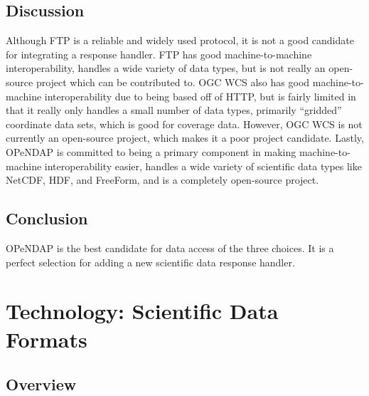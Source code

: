 \documentclass[onecolumn, draftclsnofoot,10pt, compsoc]{IEEEtran}
\begin{document}
\subsection{Discussion}
Although FTP is a reliable and widely used protocol, it is not a good candidate for integrating a response handler. FTP has good machine-to-machine interoperability, handles a wide variety of data types, but is not really an open-source project which can be contributed to. OGC WCS also has good machine-to-machine interoperability due to being based off of HTTP, but is fairly limited in that it really only handles a small number of data types, primarily “gridded” coordinate data sets, which is good for coverage data. However, OGC WCS is not currently an open-source project, which makes it a poor project candidate. Lastly, OPeNDAP is committed to being a primary component in making machine-to-machine interoperability easier, handles a wide variety of scientific data types like NetCDF, HDF, and FreeForm, and is a completely open-source project.

\subsection{Conclusion}
OPeNDAP is the best candidate for data access of the three choices. It is a perfect selection for adding a new scientific data response handler.

\section{Technology: Scientific Data Formats}

\subsection{Overview}
\end{document}
